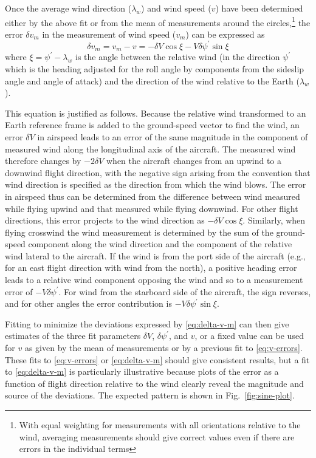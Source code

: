 \documentclass[12pt,twoside,english]{article}\usepackage[]{graphicx}\usepackage[]{color}
\begin{document}
Once the average wind direction ($\lambda_w$) and wind speed ($v$) have been determined either by the above fit or from the mean of measurements around the circles,\footnote{With equal weighting for measurements with all orientations relative to the wind, averaging measurements should give correct values even if there are errors in the individual terms} the error $\delta v_{m}$ in the measurement of wind speed ($v_{m}$) can be expressed as\\ 
\begin{equation}
\delta v_{m}=v_{m}-v=-\delta V\cos\xi-V\delta\psi^{\prime}\sin\xi\label{eq:delta-v-m} 
\end{equation}
%
where $\xi=\psi^{\prime}-\lambda_w$ is the angle between the relative wind (in the direction $\psi^{\prime}$ which is the heading adjusted for the roll angle by components from the sideslip angle and angle of attack) and the direction of the wind relative to the Earth ($\lambda_w$). 

This equation is justified as follows. Because the relative wind transformed to an Earth reference frame is added to the ground-speed vector to find the wind, an error $\delta V$ in airspeed leads to an error of the same magnitude in the component of measured wind along the longitudinal axis of the aircraft. The measured wind therefore changes by $-2\delta V$ when the aircraft changes from an upwind to a downwind flight direction, with the negative sign arising from the convention that wind direction is specified as the direction from which the wind blows. The error in airspeed thus can be determined from the difference between wind measured while flying upwind and that measured while flying downwind. For other flight directions, this error projects to the wind direction as $-\delta V\cos\xi$. Similarly, when flying crosswind the wind measurement is determined by the sum of the ground-speed component along the wind direction and the component of the relative wind lateral to the aircraft. If the wind is from the port side of the aircraft (e.g., for an east flight direction with wind from the north), a positive heading error leads to a relative wind component opposing the wind and so to a measurement error of $-V\delta\psi^{\prime}$. For wind from the starboard side of the aircraft, the sign reverses, and for other angles the error contribution is $-V\delta\psi^{\prime}\sin\xi$. 

Fitting to minimize the deviations expressed by \eqref{eq:delta-v-m} can then  give estimates of the three fit parameters $\delta V$, $\delta\psi^{\prime}$, and $v$, or a fixed value can be used for $v$ as given by the mean of measurements or by a previous fit to \eqref{eq:v-errors}. These fits to \eqref{eq:v-errors} or \eqref{eq:delta-v-m} should give consistent results, but a fit to \eqref{eq:delta-v-m} is particularly illustrative because plots of the error as a function of flight direction relative to the wind clearly reveal the magnitude and source of the deviations. The expected pattern is shown in Fig.~\ref{fig:sine-plot}. 
\end{document}
